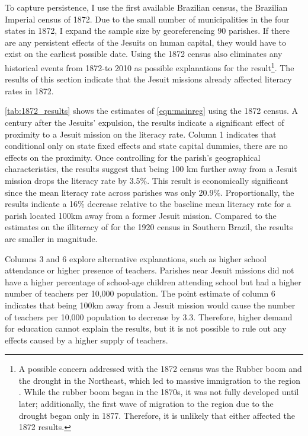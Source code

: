 \documentclass{article}
\begin{document}
To capture persistence, I use the first available Brazilian census, the Brazilian Imperial census of 1872. 
Due to the small number of municipalities in the four states in 1872, I expand the sample size by georeferencing 90 parishes. 
If there are any persistent effects of the Jesuits on human capital, they would have to exist on the earliest possible date. 
Using the 1872 census also eliminates any historical events from 1872-to 2010 as possible explanations for the result\footnote{
  A possible concern addressed with the 1872 census was the Rubber boom and the drought in the Northeast, which led to massive immigration to the region \parencite{Parker1989-ul}. While the rubber boom began in the 1870s, it was not fully developed until later; additionally, the first wave of migration to the region due to the drought began only in 1877. Therefore, it is unlikely that either affected the 1872 results.}. 
The results of this section indicate that the Jesuit missions already affected literacy rates in 1872. 

\autoref{tab:1872_results} shows the estimates of \autoref{eqn:mainreg} using the 1872 census. 
A century after the Jesuits' expulsion, the results indicate a significant effect of proximity to a Jesuit mission on the literacy rate. 
Column 1 indicates that conditional only on state fixed effects and state capital dummies, there are no effects on the proximity. 
Once controlling for the parish's geographical characteristics, the results suggest that being 100 km further away from a Jesuit mission drops the literacy rate by 3.5\%. 
This result is economically significant since the mean literacy rate across parishes was only 20.9\%. 
Proportionally, the results indicate a 16\% decrease relative to the baseline mean literacy rate for a parish located 100km away from a former Jesuit mission.
Compared to the estimates on the illiteracy of \cite{Valencia_Caicedo2018-gp} for the 1920 census in Southern Brazil, the results are smaller in magnitude. 

Columns 3 and 6 explore alternative explanations, such as higher school attendance or higher presence of teachers. 
Parishes near Jesuit missions did not have a higher percentage of school-age children attending school but had a higher number of teachers per 10,000 population. 
The point estimate of column 6 indicates that being 100km away from a Jesuit mission would cause the number of teachers per 10,000 population to decrease by 3.3. 
Therefore, higher demand for education cannot explain the results, but it is not possible to rule out any effects caused by a higher supply of teachers. 
\end{document}
